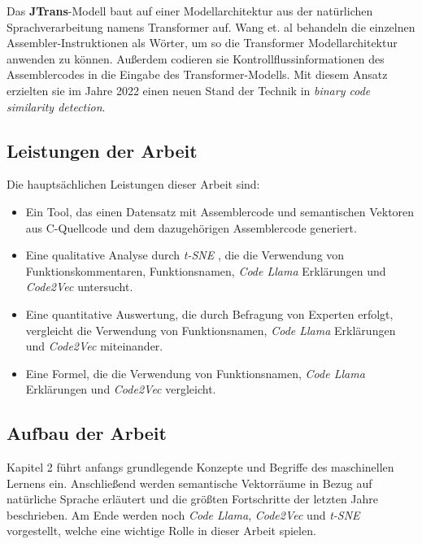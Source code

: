 \documentclass[12pt,letterpaper,ngerman]{article}
\begin{document}
Das {\bf JTrans}-Modell \cite{wang2022jtransjumpawaretransformerbinary}
baut auf einer Modellarchitektur aus der natürlichen 
Sprachverarbeitung namens 
Transformer \cite{vaswani2023attentionneed} auf. 
Wang et. al behandeln die einzelnen Assembler-Instruktionen als Wörter, um so 
die Transformer Modellarchitektur anwenden zu können. Außerdem codieren sie
Kontrollflussinformationen des Assemblercodes in die Eingabe des 
Transformer-Modells. Mit diesem Ansatz erzielten sie im Jahre 2022 einen neuen
Stand der Technik in \textit{binary code similarity detection}.

\subsection{Leistungen der Arbeit}
Die hauptsächlichen Leistungen dieser Arbeit sind:
\begin{itemize}
  \item Ein Tool, das einen Datensatz mit Assemblercode und semantischen 
    Vektoren aus C-Quellcode und dem dazugehörigen Assemblercode generiert.
  \item Eine qualitative Analyse durch 
    \textit{t-SNE} \cite{JMLR:v9:vandermaaten08a}, die die Verwendung von 
    Funktionskommentaren, Funktionsnamen, 
    \textit{Code Llama} \cite{rozière2024codellamaopenfoundation} Erklärungen
    und \textit{Code2Vec} \cite{alon2018code2veclearningdistributedrepresentations}
    untersucht.
  \item Eine quantitative Auswertung, die durch Befragung von Experten erfolgt,
    vergleicht die Verwendung von Funktionsnamen, \textit{Code Llama} 
    Erklärungen und \textit{Code2Vec} miteinander.
  \item Eine Formel, die die Verwendung von Funktionsnamen, \textit{Code Llama}
    Erklärungen und \textit{Code2Vec} vergleicht.
\end{itemize}
\pagebreak
\subsection{Aufbau der Arbeit}
Kapitel 2 führt anfangs grundlegende Konzepte und Begriffe des maschinellen 
Lernens ein. Anschließend werden semantische Vektorräume in Bezug auf 
natürliche Sprache erläutert und die größten Fortschritte der letzten Jahre 
beschrieben. Am Ende werden noch \textit{Code Llama}, \textit{Code2Vec} und 
\textit{t-SNE} vorgestellt, welche eine wichtige Rolle in dieser Arbeit spielen.\\
\end{document}
